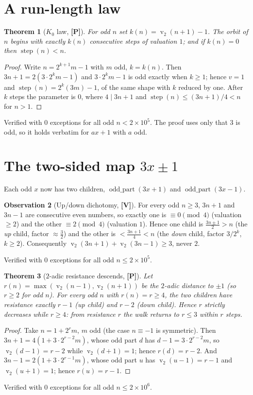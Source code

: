 \documentclass[11pt,a4paper]{article}
\theoremstyle{plain}
\newtheorem{theorem}{Theorem}[section]
\theoremstyle{definition}
\newtheorem{observation}[theorem]{Observation}
\newcommand{\val}{\operatorname{v}_2}
\newcommand{\step}{\operatorname{step}}
\begin{document}
\section{A run-length law}
\begin{theorem}[$K_0$ law, {\bf[P]}]\label{thm:k0}
For odd $n$ set $k(n)=\val(n+1)-1$. The orbit of $n$ begins with \emph{exactly} $k(n)$
consecutive steps of valuation $1$; and if $k(n)=0$ then $\step(n)<n$.
\end{theorem}
\begin{proof}
Write $n=2^{k+1}m-1$ with $m$ odd, $k=k(n)$. Then $3n+1=2(3\cdot2^{k}m-1)$ and
$3\cdot2^{k}m-1$ is odd exactly when $k\ge1$; hence $v=1$ and $\step(n)=2^{k}(3m)-1$, of the
same shape with $k$ reduced by one. After $k$ steps the parameter is $0$, where $4\mid3n+1$
and $\step(n)\le(3n+1)/4<n$ for $n>1$.
\end{proof}
\noindent Verified with $0$ exceptions for all odd $n<2\times10^{5}$. The proof uses only
that $3$ is odd, so it holds verbatim for $ax+1$ with $a$ odd.

\section{The two-sided map $3x\pm1$}
Each odd $x$ now has two children, $\operatorname{odd\_part}(3x+1)$ and
$\operatorname{odd\_part}(3x-1)$.

\begin{observation}[Up/down dichotomy, {\bf[V]}]\label{obs:ud}
For every odd $n\ge3$, $3n+1$ and $3n-1$ are consecutive even numbers, so exactly one is
$\equiv0\pmod4$ (valuation $\ge2$) and the other $\equiv2\pmod4$ (valuation $1$). Hence one
child is $\tfrac{3n\pm1}{2}>n$ (the \emph{up} child, factor $\approx\tfrac32$) and the other
is $<\tfrac{3n+1}{4}<n$ (the \emph{down} child, factor $3/2^{k}$, $k\ge2$). Consequently
$\val(3n+1)+\val(3n-1)\ge3$, never $2$.
\end{observation}
\noindent Verified with $0$ exceptions for all odd $n\le2\times10^{5}$.

\begin{theorem}[$2$-adic resistance descends, {\bf[P]}]\label{thm:res}
Let $r(n)=\max(\val(n-1),\val(n+1))$ be the $2$-adic distance to $\pm1$ (so $r\ge2$ for odd
$n$). For every odd $n$ with $r(n)=r\ge4$, the two children have resistance \emph{exactly}
$r-1$ (up child) and $r-2$ (down child). Hence $r$ strictly decreases while $r\ge4$: from
resistance $r$ the walk returns to $r\le3$ within $r$ steps.
\end{theorem}
\begin{proof}
Take $n=1+2^rm$, $m$ odd (the case $n\equiv-1$ is symmetric). Then
$3n+1=4(1+3\cdot2^{r-2}m)$, whose odd part $d$ has $d-1=3\cdot2^{r-2}m$, so
$\val(d-1)=r-2$ while $\val(d+1)=1$; hence $r(d)=r-2$. And $3n-1=2(1+3\cdot2^{r-1}m)$, whose
odd part $u$ has $\val(u-1)=r-1$ and $\val(u+1)=1$; hence $r(u)=r-1$.
\end{proof}
\noindent Verified with $0$ exceptions for all odd $n\le2\times10^{6}$.
\end{document}
